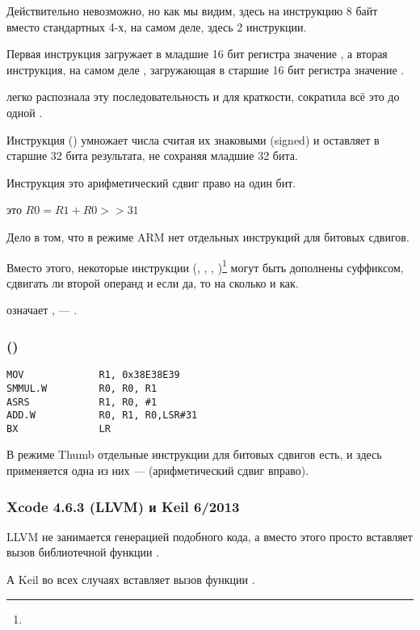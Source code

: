 Действительно невозможно, но как мы видим, здесь на инструкцию 8 байт вместо стандартных 4-х,
на самом деле, здесь 2 инструкции.

Первая инструкция загружает в младшие 16 бит регистра значение , а вторая инструкция, 
на самом деле , загружающая в старшие 16 бит регистра значение .

\IDA легко распознала эту последовательность и для краткости, сократила всё это до одной .

Инструкция  () 
умножает числа считая их знаковыми (signed) и оставляет в  старшие 32 бита результата, 
не сохраняя младшие 32 бита.

Инструкция это арифметический сдвиг право на один бит.

 это $R0=R1 + R0>>31$

\label{shifts_in_ARM_mode}
Дело в том, что в режиме ARM нет отдельных инструкций для битовых сдвигов.

Вместо этого, некоторые инструкции 
(\MOV, \ADD, \SUB, )\footnote{\DataProcessingInstructionsFootNote}
могут быть дополнены суффиксом, сдвигать ли второй операнд и если да, то на сколько и как.

 означает ,  --- .

\subsubsection{\OptimizingXcodeIV (\ThumbTwoMode)}

\begin{lstlisting}[style=customasm]
MOV             R1, 0x38E38E39
SMMUL.W         R0, R0, R1
ASRS            R1, R0, #1
ADD.W           R0, R1, R0,LSR#31
BX              LR
\end{lstlisting}

В режиме Thumb отдельные инструкции для битовых сдвигов есть, и здесь применяется одна из них --- 
(арифметический сдвиг вправо).

\subsubsection{\NonOptimizing Xcode 4.6.3 (LLVM) и Keil 6/2013}

\NonOptimizing LLVM 
не занимается генерацией подобного кода, а вместо этого просто вставляет вызов
библиотечной функции .

А Keil во всех случаях вставляет вызов функции .
